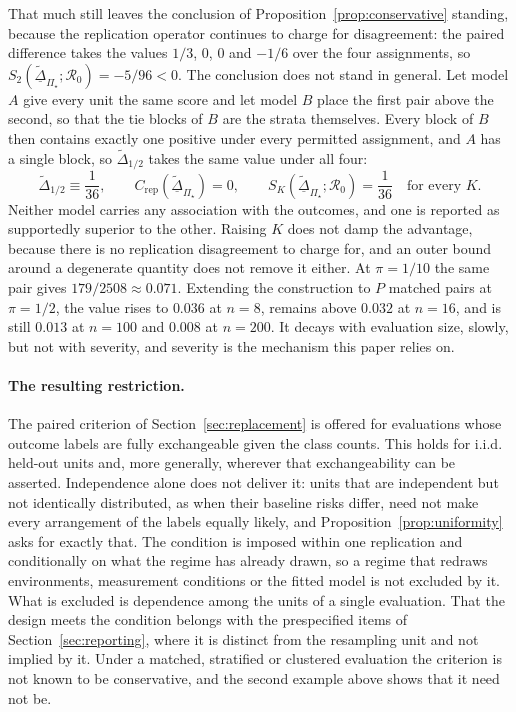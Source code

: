 \documentclass[11pt]{article}
\newcommand{\Regime}{\mathcal{R}}
\newcommand{\PSet}{\Pi_\star}
\newcommand{\Dta}{\widetilde{\Delta}}
\newcommand{\RobDta}{\underline{\widetilde{\Delta}}_{\PSet}}
\theoremstyle{remark}
\begin{document}
That much still leaves the conclusion of Proposition~\ref{prop:conservative} standing, because the replication operator continues to charge for disagreement: the paired difference takes the values $1/3$, $0$, $0$ and $-1/6$ over the four assignments, so $S_2(\RobDta;\Regime_0)=-5/96<0$. The conclusion does not stand in general. Let model $A$ give every unit the same score and let model $B$ place the first pair above the second, so that the tie blocks of $B$ are the strata themselves. Every block of $B$ then contains exactly one positive under every permitted assignment, and $A$ has a single block, so $\Dta_{1/2}$ takes the same value under all four:
\[
\Dta_{1/2}\equiv\frac{1}{36},
\qquad
C_{\mathrm{rep}}(\RobDta)=0,
\qquad
S_K(\RobDta;\Regime_0)=\frac{1}{36}
\quad\text{for every }K .
\]
Neither model carries any association with the outcomes, and one is reported as supportedly superior to the other. Raising $K$ does not damp the advantage, because there is no replication disagreement to charge for, and an outer bound around a degenerate quantity does not remove it either. At $\pi=1/10$ the same pair gives $179/2508\approx0.071$. Extending the construction to $P$ matched pairs at $\pi=1/2$, the value rises to $0.036$ at $n=8$, remains above $0.032$ at $n=16$, and is still $0.013$ at $n=100$ and $0.008$ at $n=200$. It decays with evaluation size, slowly, but not with severity, and severity is the mechanism this paper relies on.

\paragraph{The resulting restriction.}
The paired criterion of Section~\ref{sec:replacement} is offered for evaluations whose outcome labels are fully exchangeable given the class counts. This holds for i.i.d. held-out units and, more generally, wherever that exchangeability can be asserted. Independence alone does not deliver it: units that are independent but not identically distributed, as when their baseline risks differ, need not make every arrangement of the labels equally likely, and Proposition~\ref{prop:uniformity} asks for exactly that. The condition is imposed within one replication and conditionally on what the regime has already drawn, so a regime that redraws environments, measurement conditions or the fitted model is not excluded by it. What is excluded is dependence among the units of a single evaluation. That the design meets the condition belongs with the prespecified items of Section~\ref{sec:reporting}, where it is distinct from the resampling unit and not implied by it. Under a matched, stratified or clustered evaluation the criterion is not known to be conservative, and the second example above shows that it need not be.
\end{document}
